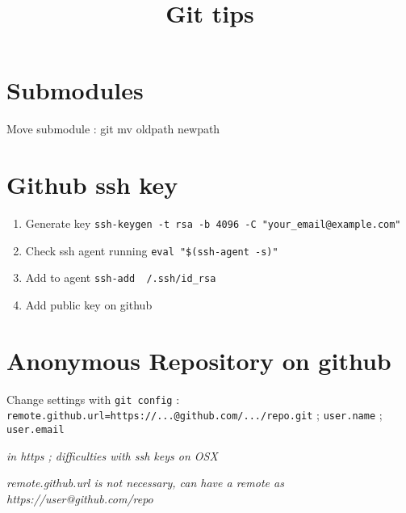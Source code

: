 


\title{Git tips}



\date{}


\maketitle

\justify

\renewcommand{\abstractname}{}

\begin{abstract}

\end{abstract}


\section*{Submodules}

Move submodule : git mv oldpath newpath


\section*{Github ssh key}


\begin{enumerate}
\item Generate key \texttt{ssh-keygen -t rsa -b 4096 -C "your{\_}email@example.com"}
\item Check ssh agent running \texttt{eval "{\$}(ssh-agent -s)"}
\item Add to agent \texttt{ssh-add ~/.ssh/id{\_}rsa}
\item Add public key on github
\end{enumerate}




\section*{Anonymous Repository on github}

Change settings with \texttt{git config} : \texttt{remote.github.url=https://...@github.com/.../repo.git} ; \texttt{user.name} ; \texttt{user.email}

\textit{in https ; difficulties with ssh keys on OSX}

\textit{remote.github.url is not necessary, can have a remote as https://user@github.com/repo}
















